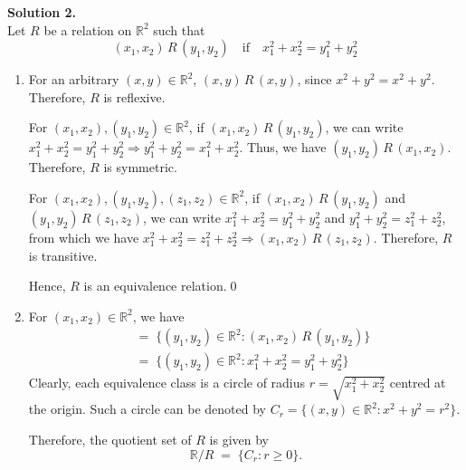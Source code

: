 \documentclass[10pt]{article}
\begin{document}
        \textbf{Solution 2.}\\
        Let $R$ be a relation on $\mathbb{R}^2$ such that
        \[(x_1, x_2)\,R\,(y_1, y_2) \quad\text{if}\quad x_1^2 + x_2^2 = y_1^2 + y_2^2\]
        \begin{enumerate}
                \item For an arbitrary $(x, y) \in \mathbb{R}^2$, $(x, y)\,R\,(x, y)$, since $x^2 + y^2 = x^2 + y^2$. Therefore, $R$
                is reflexive.

                For $(x_1, x_2), (y_1, y_2) \in \mathbb{R}^2$, if $(x_1, x_2)\,R\,(y_1, y_2)$, we can write 
                $x_1^2 + x_2^2 = y_1^2 + y_2^2 \Rightarrow y_1^2 + y_2^2 = x_1^2 + x_2^2$. Thus, we have $(y_1, y_2)\,R\,(x_1, x_2)$.
                Therefore, $R$ is symmetric.

                For $(x_1, x_2), (y_1, y_2), (z_1, z_2) \in \mathbb{R}^2$, if $(x_1, x_2)\,R\,(y_1, y_2)$ and $(y_1, y_2)\,R\,(z_1, z_2)$,
                we can write $x_1^2 + x_2^2 = y_1^2 + y_2^2$ and $y_1^2 + y_2^2 = z_1^2 + z_2^2$, from which we have
                $x_1^2 + x_2^2 = z_1^2 + z_2^2 \Rightarrow (x_1, x_2)\,R\,(z_1, z_2)$. Therefore, $R$ is transitive.

                Hence, $R$ is an equivalence relation.\qed
                
                \item For $(x_1, x_2) \in \mathbb{R}^2$, we have
                \begin{align*}
                [(x_1, x_2)] \;&=\; \{(y_1, y_2) \in \mathbb{R}^2 : (x_1, x_2)\,R\,(y_1, y_2)\} \\
                        \;&=\; \{(y_1, y_2) \in \mathbb{R}^2 : x_1^2 + x_2^2 = y_1^2 + y_2^2\}
                \end{align*}
                Clearly, each equivalence class is a circle of radius $r = \sqrt{x_1^2 + x_2^2}$ centred at the origin.
                Such a circle can be denoted by $C_r = \{(x, y) \in \mathbb{R}^2 : x^2 + y^2 = r^2\}$.
 
                Therefore, the quotient set of $R$ is given by $$\mathbb{R}/R \;=\; \{C_r : r \geq 0\}.$$\\
                \begin{center}
                \end{center}
                
        \end{enumerate}
        \clearpage
\end{document}
